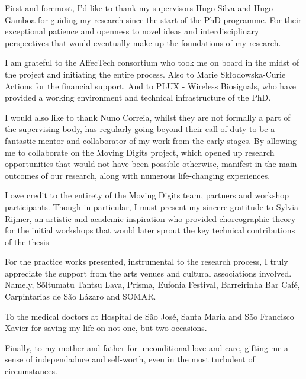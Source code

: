 

\begin{ntacknowledgements}

First and foremost, I'd like to thank my supervisors Hugo Silva and Hugo Gamboa for guiding my research since the start of the PhD programme. For their exceptional patience and openness to novel ideas and interdisciplinary perspectives that would eventually make up the foundations of my research.

I am grateful to the AffecTech consortium who took me on board in the midst of the project and initiating the entire process. Also to Marie Skłodowska-Curie Actions for the financial support. And to PLUX - Wireless Biosignals, who have provided a working environment and technical infrastructure of the PhD.

I would also like to thank Nuno Correia, whilst they are not formally a part of the supervising body, has regularly going beyond their call of duty to be a fantastic mentor and collaborator of my work from the early stages. By allowing me to collaborate on the Moving Digits project, which opened up research opportunities that would not have been possible otherwise, manifest in the main outcomes of our research, along with numerous life-changing experiences.

I owe credit to the entirety of the Moving Digits team, partners and workshop participants. Though in particular, I must present my sincere gratitude to Sylvia Rijmer, an artistic and academic inspiration who provided choreographic theory for the initial workshops that would later sprout the key technical contributions of the thesis
    
For the practice works presented, instrumental to the research process, I truly appreciate the support from the arts venues and cultural associations involved. Namely, Sõltumatu Tantsu Lava, Prisma, Eufonia Festival, Barreirinha Bar Café, Carpintarias de São Lázaro and SOMAR.

To the medical doctors at Hospital de São José, Santa Maria and São Francisco Xavier for saving my life on not one, but two occasions.

Finally, to my mother and father for unconditional love and care, gifting me a sense of independadnce and self-worth, even in the most turbulent of circumstances.

\end{ntacknowledgements}